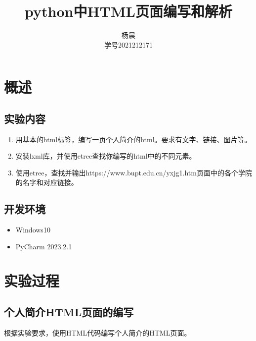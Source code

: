 \documentclass[lang=cn,11pt,a4paper]{elegantpaper}
\title{python中HTML页面编写和解析}
\author{杨晨 \\学号2021212171}
\institute{北京邮电大学 计算机学院}
\date{\zhtoday}
\begin{document}
\maketitle

\section{概述}

\subsection{实验内容}

\begin{enumerate}
    \item 用基本的html标签，编写一页个人简介的html。要求有文字、链接、图片等。

    \item 安装lxml库，并使用etree查找你编写的html中的不同元素。

    \item 使用etree，查找并输出https://www.bupt.edu.cn/yxjg1.htm页面中的各个学院的名字和对应链接。
\end{enumerate}

\subsection{开发环境}

\begin{itemize}
    \item Windows10
    \item PyCharm 2023.2.1
\end{itemize}

\section{实验过程}

\subsection{个人简介HTML页面的编写}

根据实验要求，使用HTML代码编写个人简介的HTML页面。
\end{document}

